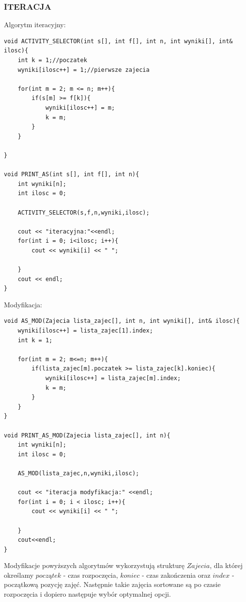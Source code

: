 \documentclass{article}
\begin{document}
\subsubsection*{ITERACJA}
Algorytm iteracyjny:
\begin{verbatim}
void ACTIVITY_SELECTOR(int s[], int f[], int n, int wyniki[], int& ilosc){
    int k = 1;//poczatek
    wyniki[ilosc++] = 1;//pierwsze zajecia

    for(int m = 2; m <= n; m++){
        if(s[m] >= f[k]){
            wyniki[ilosc++] = m;
            k = m;
        }
    }

}

void PRINT_AS(int s[], int f[], int n){
    int wyniki[n];
    int ilosc = 0;

    ACTIVITY_SELECTOR(s,f,n,wyniki,ilosc);

    cout << "iteracyjna:"<<endl;
    for(int i = 0; i<ilosc; i++){
        cout << wyniki[i] << " ";
        
    }
    cout << endl;
}
\end{verbatim}
Modyfikacja:
\begin{verbatim}
void AS_MOD(Zajecia lista_zajec[], int n, int wyniki[], int& ilosc){
    wyniki[ilosc++] = lista_zajec[1].index;
    int k = 1;

    for(int m = 2; m<=n; m++){
        if(lista_zajec[m].poczatek >= lista_zajec[k].koniec){
            wyniki[ilosc++] = lista_zajec[m].index;
            k = m;
        }
    }
}

void PRINT_AS_MOD(Zajecia lista_zajec[], int n){
    int wyniki[n];
    int ilosc = 0;

    AS_MOD(lista_zajec,n,wyniki,ilosc);

    cout << "iteracja modyfikacja:" <<endl;
    for(int i = 0; i < ilosc; i++){
        cout << wyniki[i] << " ";
        
    }
    cout<<endl; 
}
\end{verbatim}
Modyfikacje powyższych algorytmów wykorzystują strukturę $Zajecia$, dla której określamy $początek$ - czas rozpoczęcia, $koniec$ - czas zakończenia oraz $index$ - początkową pozycję zajęć. Następnie takie zajęcia sortowane są po czasie rozpoczęcia i dopiero następuje wybór optymalnej opcji.
\end{document}
